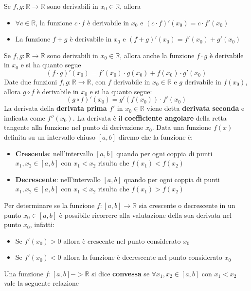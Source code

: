\documentclass[12pt]{article}
\begin{document}
Se $f, g: \mathbb{R} \rightarrow \mathbb{R}$ sono derivabili in $x_0 \in \mathbb{R}$, allora
\begin{itemize}
    \item $\forall c \in \mathbb{R}$, la funzione $c \cdot f$ è derivabile in $x_0$ e $(c \cdot f)'(x_0) = c \cdot f'(x_0)$
    \item La funzione $f + g$ è derivabile in $x_0$ e $(f+g)'(x_0) = f'(x_0) + g'(x_0)$
\end{itemize}
Se $f, g: \mathbb{R} \rightarrow \mathbb{R}$ sono derivabili in $x_0 \in \mathbb{R}$, allora anche la funzione $f \cdot g$ è derivabile
in $x_0$ e si ha quanto segue
$$(f \cdot g)'(x_0) = f'(x_0) \cdot g(x_0) + f(x_0) \cdot g'(x_0)$$
Date due funzioni $f, g: \mathbb{R} \rightarrow \mathbb{R}$, con $f$ derivabile in $x_0 \in \mathbb{R}$ e $g$ derivabile in
$f(x_0)$, allora $g \circ f$ è derivabile in $x_0$ e si ha quanto segue:
$$(g \circ f)'(x_0) = g'(f(x_0)) \cdot f'(x_0)$$
La derivata della \textbf{derivata prima $f'$} in $x_0 \in \mathbb{R}$ viene detta \textbf{derivata seconda} e indicata come $f''(x_0)$. \newline
La derivata è il \textbf{coefficiente angolare} della retta tangente alla funzione nel punto di derivazione $x_0$. \newline
Data una funzione $f(x)$ definita su un intervallo chiuso $[a,b]$ diremo che la funzione è:
\begin{itemize}
    \item \textbf{Crescente}: nell'intervallo $[a,b]$ quando per ogni coppia di punti $x_1, x_2 \in [a,b]$ con $x_1 < x_2$ risulta che $f(x_1) < f(x_2)$
    \item \textbf{Decrescente}: nell'intervallo $[a,b]$ quando per ogni coppia di punti $x_1, x_2 \in [a,b]$ con $x_1 < x_2$ risulta che $f(x_1) > f(x_2)$
\end{itemize}
Per determinare se la funzione $f:[a,b] \rightarrow \mathbb{R}$ sia crescente o decrescente in un punto $x_0 \in [a,b]$ è possibile ricorrere alla valutazione della sua derivata
nel punto $x_0$, infatti:
\begin{itemize}
    \item Se $f'(x_0) >0$ allora è crescente nel punto considerato $x_0$
    \item Se $f'(x_0) <0$ allora la funzione è decrescente nel punto considerato $x_0$
\end{itemize}
Una funzione $f:[a,b] -> \mathbb{R}$ si dice \textbf{convessa} se $\forall x_1, x_2 \in [a,b]$ con $x_1 < x_2$ vale la seguente relazione
\end{document}
